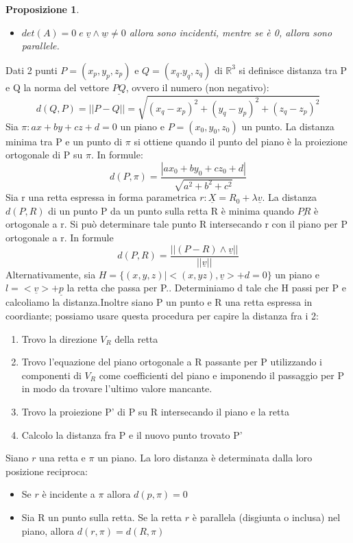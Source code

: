 \documentclass[12pt]{article}
\newenvironment{para}{\begin{adjustwidth}{13mm}{}}{\end{adjustwidth}}
\newtheorem{Proposizione}{Proposizione}[subsection]
\begin{document}
\begin{para}
\begin{Proposizione}
\begin{itemize}
    \item $det(A) = 0 \; e \; \underline{v}\land \underline{w} \neq 0$ allora sono incidenti, mentre se è 0, allora sono parallele.
\end{itemize}
\end{Proposizione}
Dati 2 punti $P = (x_p, y_p, z_p)$ e $Q = (x_q. y_q, z_q)$ di $\mathbb{R}^3$ si definisce distanza tra P e Q la norma del vettore $\underline{PQ}$, ovvero il numero (non negativo): $$d(Q,P) = \bigl||P-Q|\bigr| = \sqrt{(x_q-x_p)^2+(y_q-y_p)^2+(z_q-z_p)^2}$$
Sia $\pi: ax+by+cz+d = 0$ un piano e $P = (x_0, y_0, z_0)$ un punto. La distanza minima tra P e un punto di $\pi$ si ottiene quando il punto del piano è la proiezione ortogonale di P su $\pi$. In formule: $$d(P, \pi) = \frac{|ax_0+by_0+cz_0+d|}{\sqrt{a^2+b^2+c^2}}$$
Sia  r una retta espressa in forma parametrica $r: \underline{X} = R_0 + \lambda \underline{v}$. La distanza $d(P, R)$ di un punto P da un punto sulla retta R è minima quando $\underline{PR}$ è ortogonale a r. Si può determinare tale punto R intersecando r con il piano per P ortogonale a r. In formule $$d(P,R) = \frac{\bigl||(P-R)\land \underline{v}|\bigr|}{\bigl||\underline{v}|\bigr|}$$
Alternativamente, sia $H = \{(x,y,z)| <(x,yz), \underline{v} > + d = 0 \}$ un piano e \newline $l = <\underline{v}> + \underline{p}$ la retta che passa per P.. Determiniamo d tale che H passi per P e calcoliamo la distanza.\newline Inoltre siano P un punto e R una retta espressa in coordiante; possiamo usare questa procedura per capire la distanza fra i 2: \begin{enumerate}
    \item Trovo la direzione $V_R$ della retta 
    \item Trovo l'equazione del piano ortogonale a R passante per P utilizzando i componenti di $V_R$ come coefficienti del piano e imponendo il passaggio per P in modo da trovare l'ultimo valore mancante.
    \item Trovo la proiezione P' di P su R intersecando il piano e la retta
    \item Calcolo la distanza fra P e il nuovo punto trovato P'
\end{enumerate}
Siano $r$ una retta e $\pi$ un piano. La loro distanza è determinata dalla loro posizione reciproca:
\begin{itemize}
    \item Se $r$ è incidente a $\pi$ allora $d(p, \pi) = 0$
    \item Sia R un punto sulla retta. Se la retta $r$ è parallela (disgiunta o inclusa) nel piano, allora $d(r, \pi) = d(R, \pi)$

\end{itemize}
\end{para}
\end{document}
